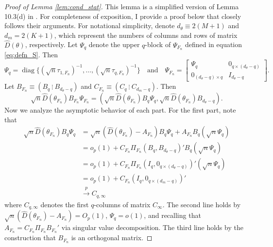 \documentclass[11pt]{article}
\theoremstyle{definition}
\DeclareMathOperator*{\diag}{diag}
\newcommand{\0}{\ensuremath{\mathbf{0}}}
\begin{document}
\begin{bibunit}
%

%
\begin{proof}[Proof of Lemma \ref{lem:cond_stat}]
This lemma is a simplified version of Lemma 10.3(d) in \citet{andrews/guggenberger:2017}. For completeness of exposition, I provide a proof below that closely follows their arguments. For notational simplicity, denote $d_\theta \equiv 2(M+1)$ and $d_m = 2(K+1)$, which represent the numbers of columns and rows of matrix $\hat{D}(\theta)$, respectively. Let $\Psi_q$ denote the upper $q$-block of $\Psi_{F_n}$ defined in equation \eqref{eq:defn_S}. Then
	\begin{equation}
	 	\Psi_q = \diag\{(\sqrt{n}\tau_{1,F_n})^{-1},\ldots, (\sqrt{n}\tau_{q,F_n})^{-1}\} 
		\quad\text{and}\quad
		\Psi_{F_n} = 
		\begin{bmatrix}
		\Psi_q & 0_{q\times (d_\theta - q)} \\
		0_{(d_\theta - q)\times q} & I_{d_\theta - q}
		\end{bmatrix}.
	\end{equation}
	Let $B_{F_n} \equiv (B_q ~\vdots~ B_{d_\theta - q})$ and $C_{F_n} \equiv (C_q ~\vdots~ C_{d_m - q})$.
	Then 
	\[
	\sqrt{n}\hat{D}(\theta_{F_n}) B_{F_n} \Psi_{F_n}
	 = (\sqrt{n} \hat{D}(\theta_{F_n}) B_q \Psi_q, \sqrt{n} \hat{D}(\theta_{F_n}) B_{d_\theta-q}).
	\]
	Now we analyze the asymptotic behavior of each part. For the first part, note that 
	\begin{align*}
		\sqrt{n}\hat{D}(\theta_{F_n}) B_q \Psi_q 
		& = \sqrt{n}(\hat{D}(\theta_{F_n}) - A_{F_n})B_q \Psi_q +  A_{F_n} B_q (\sqrt{n}\Psi_q) \\
		& = o_p(1) + C_{F_n}\Pi_{F_n} (B_q, B_{d_\theta - q})' B_q (\sqrt{n}\Psi_q) \\
		& = o_p(1) + C_{F_n}\Pi_{F_n} (I_q, 0_{q \times (d_\theta - q)})' (\sqrt{n}\Psi_q) \\
		& = o_p(1) + C_{F_n}(I_q, 0_{q\times (d_m - q)})' \\
		& \xrightarrow{p} C_{q,\infty}
	\end{align*}
	where $C_{q,\infty}$ denotes the first $q$-columns of matrix $C_\infty$. The second line holds by $\sqrt{n}(\hat{D}(\theta_{F_n}) - A_{F_n}) = O_p(1)$, $\Psi_q = o(1)$, and recalling that $A_{F_n} = C_{F_n} \Pi_{F_n} B_{F_n}'$ via singular value decomposition. The third line holds by the construction that $B_{F_n}$ is an orthogonal matrix. 


\end{proof}
\end{bibunit}
\end{document}
